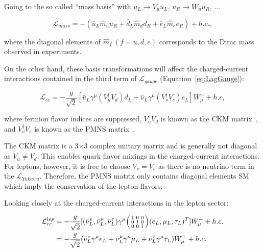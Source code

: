 Going to the so called ``mass basis'' with $u_{L}\rightarrow V_{u}u_{L}$, $u_{R}\rightarrow W_{u}u_{R}$, ...

\begin{equation}
\mathcal{L}_{mass}=-(\bar{u}_{L}\hat{m}_{u}u_{R}+\bar{d}_{L}\hat{m}_{d}d_{R}+\bar{e}_{L}\hat{m}_{e}e_{R}) + h.c.,
\end{equation}

where the diagonal elements of $\hat{m}_{f}~(f=u,d,e)$ corresponds to the Dirac mass observed in experiments. 

On the other hand, these basis transformations will affect the charged-current interactions contained in the third term of $\mathcal{L}_{gauge}$ (Equation~\ref{eq:LagGauge}):

\begin{equation}
\mathcal{L}_{cc}=-\frac{g}{\sqrt{2}}[\bar{u}_{L}\gamma^{\mu}(V_{u}^{\dagger}V_{d})d_{L}+\bar{\nu}_{L}\gamma^{\mu}(V_{\nu}^{\dagger}V_{e})e_{L}]W_{\mu}^{+} + h.c, 
\end{equation}

where fermion flavor indices are suppressed, $V_{u}^{\dagger}V_{d}$ is known as the \ac{CKM} matrix~\cite{Cabibbo:1963yz,Kobayashi:1973fv}, and $V_{\nu}^{\dagger}V_{e}$ is known as the \ac{PMNS} matrix~\cite{Pontecorvo:1957cp,Maki:1962mu}. 

The \ac{CKM} matrix is a 3$\times$3 complex unitary matrix and is generally not diagonal as $V_{u}\neq V_{d}$. This enables quark flavor mixings in the charged-current interactions. For leptons, however, it is free to choose $V_{\nu}=V_{e}$ as there is no neutrino term in the $\mathcal{L}_{Yukawa}$. Therefore, the \ac{PMNS} matrix only contains diagonal elements \ac{SM} which imply the conservation of the lepton flavors.  

Looking closely at the charged-current interactions in the lepton sector:

\begin{equation}
\label{eq:LepCC}
\begin{split}
\mathcal{L}_{cc}^{lep}&=-\frac{g}{\sqrt{2}}[(\bar{\nu}_{L}^{e},\bar{\nu}_{L}^{\mu},\bar{\nu}^{\tau}_{L})\gamma^{\mu}\begin{psmallmatrix}1&0&0\\0&1&0\\0&0&1\end{psmallmatrix}(e_{L},\mu_{L},\tau_{L})^{T}]W_{\mu}^{+} + h.c.\\
&=-\frac{g}{\sqrt{2}}(\bar{\nu}_{L}^{e}\gamma^{\mu}e_{L}+\bar{\nu}_{L}^{\mu}\gamma^{\mu}\mu_{L}+\bar{\nu}_{L}^{\tau}\gamma^{\mu}\tau_{L})W^{+}_{\mu} + h.c.
\end{split}
\end{equation}

